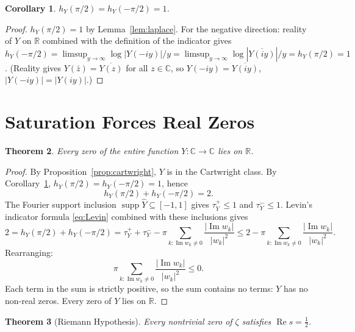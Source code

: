 \documentclass[11pt,a4paper]{article}
\theoremstyle{plain}
\newtheorem{theorem}{Theorem}
\newtheorem{corollary}[theorem]{Corollary}
\theoremstyle{definition}
\newcommand{\R}{\mathbb{R}}
\newcommand{\C}{\mathbb{C}}
\DeclareMathOperator{\supp}{supp}
\DeclareMathOperator{\Real}{Re}
\DeclareMathOperator{\Imag}{Im}
\begin{document}
\begin{corollary}\label{cor:hY}
$h_Y(\pi/2)=h_Y(-\pi/2)=1$.
\end{corollary}

\begin{proof}
$h_Y(\pi/2)=1$ by Lemma~\ref{lem:laplace}. For the negative direction: reality of $Y$ on $\R$ combined with the definition of the indicator gives $h_Y(-\pi/2)=\limsup_{y\to\infty}\log|Y(-iy)|/y=\limsup_{y\to\infty}\log|\overline{Y(iy)}|/y=h_Y(\pi/2)=1$. (Reality gives $Y(\bar z)=\overline{Y(z)}$ for all $z\in\C$, so $Y(-iy)=\overline{Y(iy)}$, $|Y(-iy)|=|Y(iy)|$.)
\end{proof}

\section{Saturation Forces Real Zeros}

\begin{theorem}\label{thm:realzeros}
Every zero of the entire function $Y:\C\to\C$ lies on $\R$.
\end{theorem}

\begin{proof}
By Proposition~\ref{prop:cartwright}, $Y$ is in the Cartwright class. By Corollary~\ref{cor:hY}, $h_Y(\pi/2)=h_Y(-\pi/2)=1$, hence
\[
h_Y(\pi/2)+h_Y(-\pi/2)=2.
\]
The Fourier support inclusion $\supp\hat Y\subseteq[-1,1]$ gives $\tau_Y^+\le 1$ and $\tau_Y^-\le 1$. Levin's indicator formula \eqref{eq:Levin} combined with these inclusions gives
\[
2=h_Y(\pi/2)+h_Y(-\pi/2)=\tau_Y^++\tau_Y^--\pi\!\!\sum_{k:\Imag w_k\neq 0}\!\!\frac{|\Imag w_k|}{|w_k|^2}\le 2-\pi\!\!\sum_{k:\Imag w_k\neq 0}\!\!\frac{|\Imag w_k|}{|w_k|^2}.
\]
Rearranging:
\[
\pi\!\!\sum_{k:\Imag w_k\neq 0}\!\!\frac{|\Imag w_k|}{|w_k|^2}\le 0.
\]
Each term in the sum is strictly positive, so the sum contains no terms: $Y$ has no non-real zeros. Every zero of $Y$ lies on $\R$.
\end{proof}

\begin{theorem}[Riemann Hypothesis]\label{thm:RH}
Every nontrivial zero of $\zeta$ satisfies $\Real s=\tfrac12$.
\end{theorem}
\end{document}
